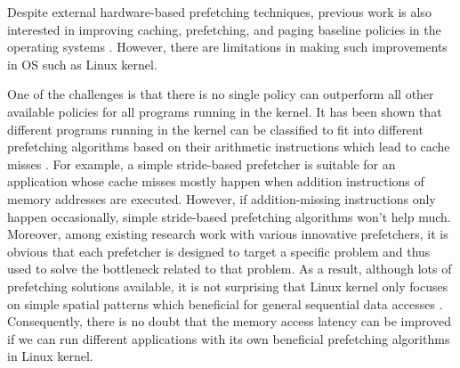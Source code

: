 Despite external hardware-based prefetching techniques,
previous work is also interested in improving caching, prefetching, and paging baseline policies in the operating systems \cite{Leap, spec-paging, Lynx}. However, there are limitations in making such improvements in OS such as Linux kernel.


One of the challenges is that there is no single policy can outperform all other available policies for all programs running in the kernel.
It has been shown that different programs running in the kernel can be classified to fit into different prefetching algorithms based on their arithmetic instructions which lead to cache misses \cite{Classify_prefetch}.
For example, a simple stride-based prefetcher is suitable for an application whose cache misses mostly happen when addition instructions of memory addresses are executed.
However, if addition-missing instructions only happen occasionally, simple stride-based prefetching algorithms won't help much.
Moreover, among existing research work with various innovative prefetchers, it is obvious that each prefetcher is designed to target a specific problem and thus used to solve the bottleneck related to that problem.
As a result, although lots of prefetching solutions available, it is not surprising that Linux kernel only focuses on simple spatial patterns which beneficial for general sequential data accesses \cite{kernel-prefetch-cache-replace}. 
Consequently, there is no doubt that the memory access latency can be improved if we can run different applications with its own beneficial prefetching algorithms in Linux kernel.

